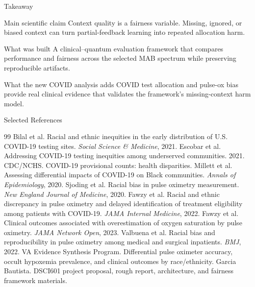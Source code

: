\documentclass[aspectratio=169,10pt]{beamer}
\begin{document}
\begin{frame}{Takeaway}
\begin{block}{Main scientific claim}
Context quality is a fairness variable. Missing, ignored, or biased context can turn partial-feedback learning into repeated allocation harm.
\end{block}

\begin{block}{What was built}
A clinical--quantum evaluation framework that compares performance and fairness across the selected MAB spectrum while preserving reproducible artifacts.
\end{block}

\begin{block}{What the new COVID analysis adds}
COVID test allocation and pulse-ox bias provide real clinical evidence that validates the framework's missing-context harm model.
\end{block}
\end{frame}

\begin{frame}[allowframebreaks]{Selected References}
\scriptsize
\begin{thebibliography}{99}
 Bilal et al. Racial and ethnic inequities in the early distribution of U.S. COVID-19 testing sites. \textit{Social Science \& Medicine}, 2021.
 Escobar et al. Addressing COVID-19 testing inequities among underserved communities. 2021.
 CDC/NCHS. COVID-19 provisional counts: health disparities.
 Millett et al. Assessing differential impacts of COVID-19 on Black communities. \textit{Annals of Epidemiology}, 2020.
 Sjoding et al. Racial bias in pulse oximetry measurement. \textit{New England Journal of Medicine}, 2020.
 Fawzy et al. Racial and ethnic discrepancy in pulse oximetry and delayed identification of treatment eligibility among patients with COVID-19. \textit{JAMA Internal Medicine}, 2022.
 Fawzy et al. Clinical outcomes associated with overestimation of oxygen saturation by pulse oximetry. \textit{JAMA Network Open}, 2023.
 Valbuena et al. Racial bias and reproducibility in pulse oximetry among medical and surgical inpatients. \textit{BMJ}, 2022.
 VA Evidence Synthesis Program. Differential pulse oximeter accuracy, occult hypoxemia prevalence, and clinical outcomes by race/ethnicity.
 Garcia Bautista. DSCI601 project proposal, rough report, architecture, and fairness framework materials.
\end{thebibliography}
\end{frame}
\end{document}
